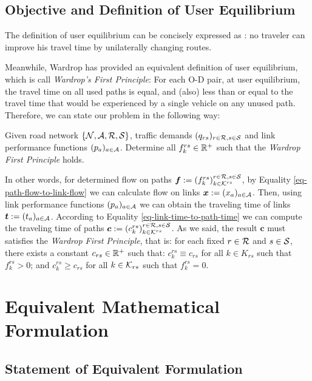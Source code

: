 \documentclass{article}
\begin{document}
\subsection{Objective and Definition of User Equilibrium}

The definition of user equilibrium can be concisely expressed as \cite{Shef85}: no traveler can improve his travel time by unilaterally changing routes.

Meanwhile, Wardrop \cite{wardrop1952road} has provided an equivalent definition of user equilibrium, which is call \textit{Wardrop's First Principle}: For each O-D pair, at user equilibrium, the travel time on all used paths is equal, and (also) less than or equal to the travel time that would be experienced by a single vehicle on any unused path. Therefore, we can state our problem in the following way:

\begin{prob} \label{prob-wardrop}
    Given road network $ \{ \mathcal{N}, \mathcal{A}, \mathcal{R}, \mathcal{S} \} $, traffic demands $ (q_{rs})_{r \in \mathcal{R}, s \in \mathcal{S}} $ and link performance functions $ (p_a)_{a \in \mathcal{A}} $. Determine all $ f_k^{rs} \in \mathbb{R}^+ $ such that the \textit{Wardrop First Principle} holds.
\end{prob}

In other words, for determined flow on paths $ \boldsymbol{f} := \left( f_k^{rs} \right)_{k \in \mathcal{K}^{rs}}^{r \in \mathcal{R}, s \in \mathcal{S}} $, by Equality \ref{eq-path-flow-to-link-flow} we can calculate flow on links $ \boldsymbol{x} := (x_a)_{a \in \mathcal{A}} $. Then, using link performance functions $ (p_a)_{a \in \mathcal{A}} $ we can obtain the traveling time of links $ \boldsymbol{t} := (t_a)_{a \in \mathcal{A}} $. According to Equality \ref{eq-link-time-to-path-time} we can compute the traveling time of paths $ \boldsymbol{c} := \left( c_k^{rs} \right)_{k \in \mathcal{K}^{rs}}^{r \in \mathcal{R}, s \in \mathcal{S}} $. As we said, the result $ \boldsymbol{c} $ must satisfies the \textit{Wardrop First Principle}, that is: for each fixed $ r \in \mathcal{R} $ and $ s \in \mathcal{S} $, there exists a constant $ c_{rs} \in \mathbb{R}^+ $ such that: $ c_k^{rs} \equiv c_{rs} $ for all $ k \in K_{rs} $ such that $ f_k^{rs} > 0 $; and $ c_k^{rs} \ge c_{rs} $ for all $ k \in \mathcal{K}_{rs} $ such that $ f_k^{rs} = 0 $. 

\section{Equivalent Mathematical Formulation}

\subsection{Statement of Equivalent Formulation}
\end{document}
